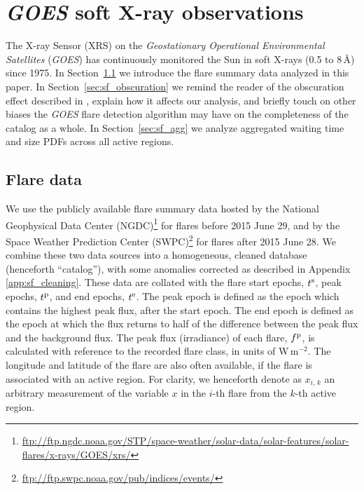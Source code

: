 \section{\emph{GOES} soft X-ray observations} \label{sec:sf_data}
The X-ray Sensor (XRS) on the \emph{Geostationary Operational Environmental Satellites} (\emph{GOES}) has continuously monitored the Sun in soft X-rays (0.5 to 8\,\AA) since 1975. In Section~\ref{sec:sf_summary} we introduce the flare summary data analyzed in this paper. In Section~\ref{sec:sf_obscuration} we remind the reader of the obscuration effect described in \citet{Wheatland2001}, explain how it affects our analysis, and briefly touch on other biases the \emph{GOES} flare detection algorithm may have on the completeness of the catalog as a whole. In Section~\ref{sec:sf_agg} we analyze aggregated waiting time and size PDFs across all active regions. 

\subsection{Flare data} \label{sec:sf_summary}
We use the publicly available flare summary data hosted by the National Geophysical Data Center (NGDC)\footnote{\url{ftp://ftp.ngdc.noaa.gov/STP/space-weather/solar-data/solar-features/solar-flares/x-rays/GOES/xrs/}} for flares before 2015 June 29, and by the Space Weather Prediction Center (SWPC)\footnote{\url{ftp://ftp.swpc.noaa.gov/pub/indices/events/}} for flares after 2015 June 28. We combine these two data sources into a homogeneous, cleaned database (henceforth ``catalog''), with some anomalies corrected as described in Appendix \ref{app:sf_cleaning}. These data are collated with the flare start epochs, $t^{\rm s}$, peak epochs, $t^{\rm p}$, and end epochs, $t^{\rm e}$. The peak epoch is defined as the epoch which contains the highest peak flux, after the start epoch. The end epoch is defined as the epoch at which the flux returns to half of the difference between the peak flux and the background flux. The peak flux (irradiance) of each flare, $f^{\rm p}$, is calculated with reference to the recorded flare class, in units of W\,m$^{-2}$. The longitude and latitude of the flare are also often available, if the flare is associated with an active region. For clarity, we henceforth denote as $x_{i,\,k}$ an arbitrary measurement of the variable $x$ in the $i$-th flare from the $k$-th active region.

